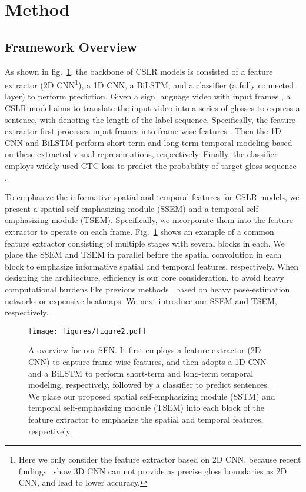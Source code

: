 \documentclass[letterpaper]{article} \usepackage{aaai23}  \usepackage{times}  \usepackage{helvet}  \usepackage{courier}  \usepackage[hyphens]{url}  \usepackage{graphicx} \urlstyle{rm} \def\UrlFont{\rm}  \usepackage{natbib}  \usepackage{caption} \frenchspacing  \setlength{\pdfpagewidth}{8.5in} \setlength{\pdfpageheight}{11in} \usepackage{algorithm}
\begin{document}
\section{Method}
\subsection{Framework Overview}
As shown in fig.~\ref{fig2}, the backbone of CSLR models is consisted of a feature extractor (2D CNN\footnote{Here we only consider the feature extractor based on 2D CNN, because recent findings~\cite{adaloglou2021comprehensive,zuo2022c2slr} show 3D CNN can not provide as precise gloss boundaries as 2D CNN, and lead to lower accuracy. }), a 1D CNN, a BiLSTM, and a classifier (a fully connected layer) to perform prediction. Given a sign language video with  input frames , a CSLR model aims to translate the input video into a series of glosses  to express a sentence, with  denoting the length of the label sequence. Specifically, the feature extractor first processes input frames into frame-wise features . Then the 1D CNN and BiLSTM perform short-term and long-term temporal modeling based on these extracted visual representations, respectively. Finally, the classifier employs widely-used CTC loss to predict the probability of target gloss sequence .

To emphasize the informative spatial and temporal features for CSLR models, we present a spatial self-emphasizing module (SSEM) and a temporal self-emphasizing module (TSEM). Specifically, we incorporate them into the feature extractor to operate on each frame. Fig.~\ref{fig2} shows an example of a common feature extractor consisting of multiple stages with several blocks in each. We place the SSEM and TSEM in parallel before the  spatial convolution in each block to emphasize informative spatial and temporal features, respectively. When designing the architecture, efficiency is our core consideration, to avoid heavy computational burdens like previous methods~\cite{zhou2020spatial,zuo2022c2slr} based on heavy pose-estimation networks or expensive heatmaps. We next introduce our SSEM and TSEM, respectively. 

\begin{figure}[t]
\centering
\texttt{[image: figures/figure2.pdf]}
\caption{A overview for our SEN. It first employs a feature extractor (2D CNN) to capture frame-wise features, and then adopts a 1D CNN and a BiLSTM to perform short-term and long-term temporal modeling, respectively, followed by a classifier to predict sentences. We place our proposed spatial self-emphasizing module (SSTM) and temporal self-emphasizing module (TSEM) into each block of the feature extractor to emphasize the spatial and temporal features, respectively.}
\label{fig2}
\end{figure}
\end{document}
